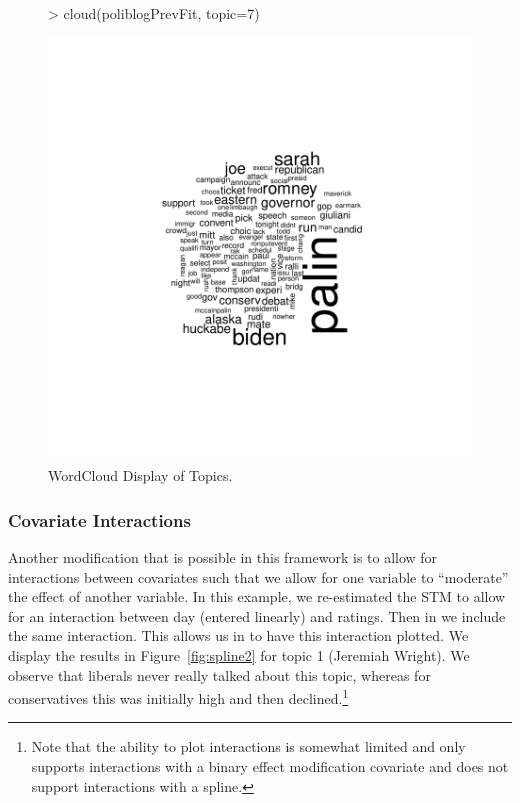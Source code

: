 \documentclass[nojss]{jss}
\begin{document}
\begin{figure}
\begin{center}
\begin{Schunk}
\begin{Sinput}
> cloud(poliblogPrevFit, topic=7)
\end{Sinput}
\end{Schunk}
\includegraphics{stmVignette-020}
\caption{WordCloud Display of Topics.}
\label{fig:cloud}
\end{center}
\end{figure}

\subsubsection{Covariate Interactions}

Another modification that is possible in this framework is to allow for interactions between covariates such that we allow for one variable to ``moderate'' the effect of another variable. In this example, we re-estimated the STM to allow for an interaction between day (entered linearly) and ratings. Then in  we include the same interaction. This allows us in  to have this interaction plotted. We display the results in Figure~\ref{fig:spline2} for topic 1 (Jeremiah Wright). We observe that liberals never really talked about this topic, whereas for conservatives this was initially high and then declined.\footnote{Note that the ability to plot interactions is somewhat limited and only supports interactions with a binary effect modification covariate and does not support interactions with a spline.}
\end{document}
